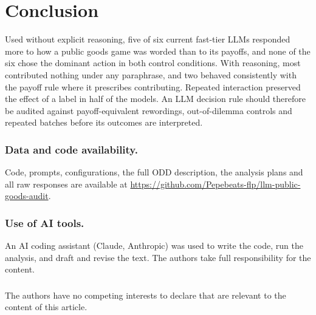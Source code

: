\documentclass[runningheads]{llncs}
\begin{document}
\section{Conclusion}

Used without explicit reasoning, five of six current fast-tier LLMs responded more to how a public goods game was worded than to its payoffs, and none of the six chose the dominant action in both control conditions. With reasoning, most contributed nothing under any paraphrase, and two behaved consistently with the payoff rule where it prescribes contributing. Repeated interaction preserved the effect of a label in half of the models. An LLM decision rule should therefore be audited against payoff-equivalent rewordings, out-of-dilemma controls and repeated batches before its outcomes are interpreted.

\begin{credits}
\subsubsection{Data and code availability.} Code, prompts, configurations, the full ODD description, the analysis plans and all raw responses are available at \url{https://github.com/Pepebeats-flp/llm-public-goods-audit}.

\subsubsection{Use of AI tools.} An AI coding assistant (Claude, Anthropic) was used to write the code, run the analysis, and draft and revise the text. The authors take full responsibility for the content.

\subsubsection{\discintname}
The authors have no competing interests to declare that are relevant to the content of this article.
\end{credits}



\end{document}
